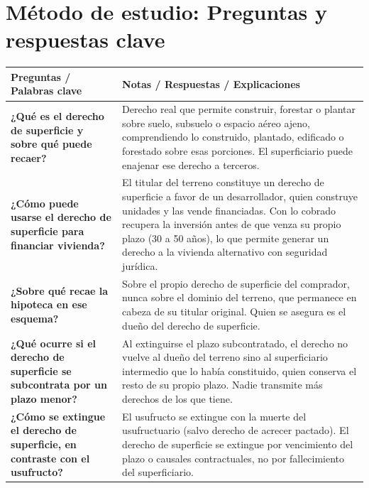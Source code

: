 \documentclass[12pt,oneside]{book}
\begin{document}
\thispagestyle{plain}

\vspace{1cm}

\section*{Método de estudio: Preguntas y respuestas clave}

\begin{table}[H]
\centering
\renewcommand{\arraystretch}{1.8}
\begin{tabularx}{\textwidth}{
    >{\raggedright\arraybackslash}p{}
    >{\raggedright\arraybackslash}X
}
\toprule
\textbf{Preguntas / Palabras clave} &
\textbf{Notas / Respuestas / Explicaciones} \\
\midrule

\textbf{¿Qué es el derecho de superficie y sobre qué puede recaer?} &
Derecho real que permite construir, forestar o plantar sobre suelo, subsuelo o espacio aéreo ajeno, comprendiendo lo construido, plantado, edificado o forestado sobre esas porciones. El superficiario puede enajenar ese derecho a terceros. \\

\textbf{¿Cómo puede usarse el derecho de superficie para financiar vivienda?} &
El titular del terreno constituye un derecho de superficie a favor de un desarrollador, quien construye unidades y las vende financiadas. Con lo cobrado recupera la inversión antes de que venza su propio plazo (30 a 50 años), lo que permite generar un derecho a la vivienda alternativo con seguridad jurídica. \\

\textbf{¿Sobre qué recae la hipoteca en ese esquema?} &
Sobre el propio derecho de superficie del comprador, nunca sobre el dominio del terreno, que permanece en cabeza de su titular original. Quien se asegura es el dueño del derecho de superficie. \\

\textbf{¿Qué ocurre si el derecho de superficie se subcontrata por un plazo menor?} &
Al extinguirse el plazo subcontratado, el derecho no vuelve al dueño del terreno sino al superficiario intermedio que lo había constituido, quien conserva el resto de su propio plazo. Nadie transmite más derechos de los que tiene. \\

\textbf{¿Cómo se extingue el derecho de superficie, en contraste con el usufructo?} &
El usufructo se extingue con la muerte del usufructuario (salvo derecho de acrecer pactado). El derecho de superficie se extingue por vencimiento del plazo o causales contractuales, no por fallecimiento del superficiario. \\


\end{tabularx}
\end{table}
\end{document}
